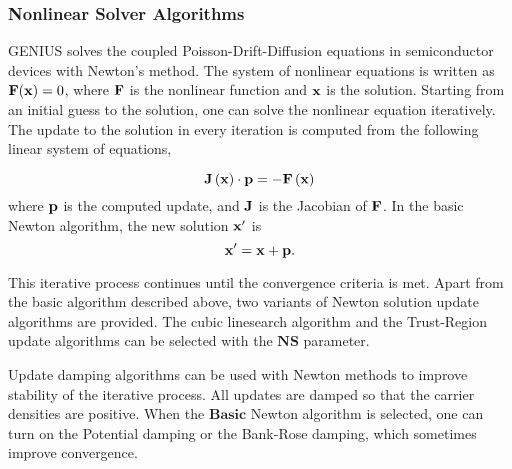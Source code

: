 \documentclass[oneside,12pt]{cgd_book}
\begin{document}
\subsubsection{Nonlinear Solver Algorithms}
GENIUS solves the coupled Poisson-Drift-Diffusion equations in semiconductor devices with Newton's
          method. The system of nonlinear equations is written as
${\bf F}({\bf x})=0$,
          where ${\bf F}$ is the nonlinear function and ${\bf
          x}$ is the solution. Starting from an initial guess to the solution, one can solve the nonlinear
          equation iteratively. The update to the solution in every iteration is computed from the following linear
          system of equations,
\par
\begin{equation}
\label{eq:CmdRef:Method:Nonlinear:Eqn}
{\bf J}\left({\bf x}\right) \cdot {\bf p} = - {\bf F} \left({\bf x}\right)
\end{equation}
where ${\bf p}$ is the computed update, and ${\bf
          J}$ is the Jacobian of ${\bf F}$. In the basic Newton algorithm, the new
          solution ${\bf x}^{\prime}$ is
\begin{equation}
{\bf x}^{\prime} = {\bf x} + {\bf p}.
\end{equation}
\par
\par
This iterative process continues until the convergence criteria is met. Apart from the basic algorithm
          described above, two variants of Newton solution update algorithms are provided. The cubic linesearch
          algorithm and the Trust-Region update algorithms can be selected with the
$\mathbf{NS}$ parameter.
\par
Update damping algorithms can be used with Newton methods to improve stability of the iterative process.
          All updates are damped so that the carrier densities are positive. When the
$\mathbf{Basic}$ Newton algorithm is selected, one can turn on the Potential damping or the Bank-Rose damping, which sometimes
          improve convergence.
\par
\end{document}
